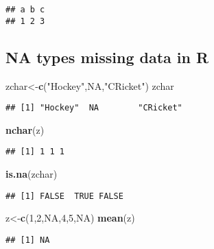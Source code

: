 \documentclass[
]{article}
\newenvironment{Shaded}{\begin{snugshade}}{\end{snugshade}}
\newcommand{\ConstantTok}[1]{\textcolor[rgb]{0.56,0.35,0.01}{#1}}
\newcommand{\DecValTok}[1]{\textcolor[rgb]{0.00,0.00,0.81}{#1}}
\newcommand{\FunctionTok}[1]{\textcolor[rgb]{0.13,0.29,0.53}{\textbf{#1}}}
\newcommand{\NormalTok}[1]{#1}
\newcommand{\OtherTok}[1]{\textcolor[rgb]{0.56,0.35,0.01}{#1}}
\newcommand{\StringTok}[1]{\textcolor[rgb]{0.31,0.60,0.02}{#1}}
\begin{document}
\begin{verbatim}
## a b c 
## 1 2 3
\end{verbatim}

\subsection{NA types missing data in
R}\label{na-types-missing-data-in-r}

\begin{Shaded}
\begin{Highlighting}[]
\NormalTok{zchar}\OtherTok{\textless{}{-}}\FunctionTok{c}\NormalTok{(}\StringTok{"Hockey"}\NormalTok{,}\ConstantTok{NA}\NormalTok{,}\StringTok{"CRicket"}\NormalTok{)}
\NormalTok{zchar}
\end{Highlighting}
\end{Shaded}

\begin{verbatim}
## [1] "Hockey"  NA        "CRicket"
\end{verbatim}

\begin{Shaded}
\begin{Highlighting}[]
\FunctionTok{nchar}\NormalTok{(z)}
\end{Highlighting}
\end{Shaded}

\begin{verbatim}
## [1] 1 1 1
\end{verbatim}

\begin{Shaded}
\begin{Highlighting}[]
\FunctionTok{is.na}\NormalTok{(zchar)}
\end{Highlighting}
\end{Shaded}

\begin{verbatim}
## [1] FALSE  TRUE FALSE
\end{verbatim}

\begin{Shaded}
\begin{Highlighting}[]
\NormalTok{z}\OtherTok{\textless{}{-}}\FunctionTok{c}\NormalTok{(}\DecValTok{1}\NormalTok{,}\DecValTok{2}\NormalTok{,}\ConstantTok{NA}\NormalTok{,}\DecValTok{4}\NormalTok{,}\DecValTok{5}\NormalTok{,}\ConstantTok{NA}\NormalTok{)}
\FunctionTok{mean}\NormalTok{(z)}
\end{Highlighting}
\end{Shaded}

\begin{verbatim}
## [1] NA
\end{verbatim}
\end{document}
